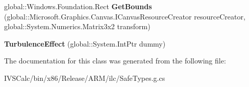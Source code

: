 \begin{DoxyCompactItemize}
\item 
\mbox{\label{class_microsoft_1_1_graphics_1_1_canvas_1_1_effects_1_1_turbulence_effect_a3a6ab674e0ac6ee842030f2a1f7c0ad4}} 
global\+::\+Windows.\+Foundation.\+Rect {\bfseries Get\+Bounds} (global\+::\+Microsoft.\+Graphics.\+Canvas.\+I\+Canvas\+Resource\+Creator resource\+Creator, global\+::\+System.\+Numerics.\+Matrix3x2 transform)
\item 
\mbox{\label{class_microsoft_1_1_graphics_1_1_canvas_1_1_effects_1_1_turbulence_effect_a7138fc554faf8edbe9dd225b0d269fa1}} 
{\bfseries Turbulence\+Effect} (global\+::\+System.\+Int\+Ptr dummy)
\end{DoxyCompactItemize}


The documentation for this class was generated from the following file\+:\begin{DoxyCompactItemize}
\item 
I\+V\+S\+Calc/bin/x86/\+Release/\+A\+R\+M/ilc/Safe\+Types.\+g.\+cs\end{DoxyCompactItemize}
